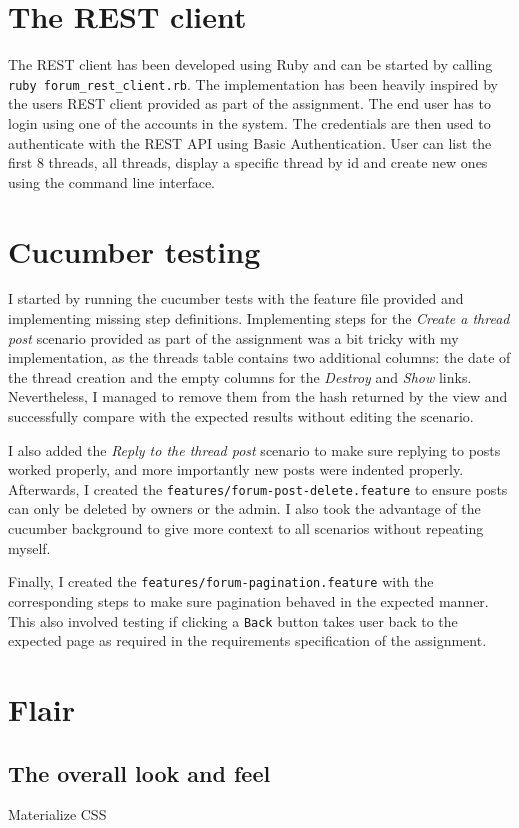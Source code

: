 \documentclass[a4paper, 11pt, titlepage]{article}
\begin{document}
\section{The REST client}
The REST client has been developed using Ruby and can be started by calling \texttt{ruby forum\_rest\_client.rb}.
The implementation has been heavily inspired by the users REST client provided as part of the assignment.
The end user has to login using one of the accounts in the system. The credentials are then used to authenticate
with the REST API using Basic Authentication. User can list the first 8 threads, all threads, display a specific
thread by id and create new ones using the command line interface.

\section{Cucumber testing}
I started by running the cucumber tests with the feature file provided and implementing
missing step definitions. Implementing steps for the \textit{Create a thread post} scenario
provided as part of the assignment was a bit tricky with my implementation, as the
threads table contains two additional columns: the date of the thread creation and the
empty columns for the \textit{Destroy} and \textit{Show} links. Nevertheless, I managed to
remove them from the hash returned by the view and successfully compare with the expected
results without editing the scenario.

I also added the \textit{Reply to the thread post} scenario to make sure replying to
posts worked properly, and more importantly new posts were indented properly. Afterwards,
I created the \texttt{features/forum-post-delete.feature} to ensure posts can only be deleted
by owners or the admin. I also took the advantage of the cucumber background to give
more context to all scenarios without repeating myself.

Finally, I created the \texttt{features/forum-pagination.feature} with the corresponding
steps to make sure pagination behaved in the expected manner. This also involved testing
if clicking a \texttt{Back} button takes user back to the expected page as required in the
requirements specification of the assignment. 

\section{Flair}
\subsection{The overall look and feel}
Materialize CSS
\end{document}
